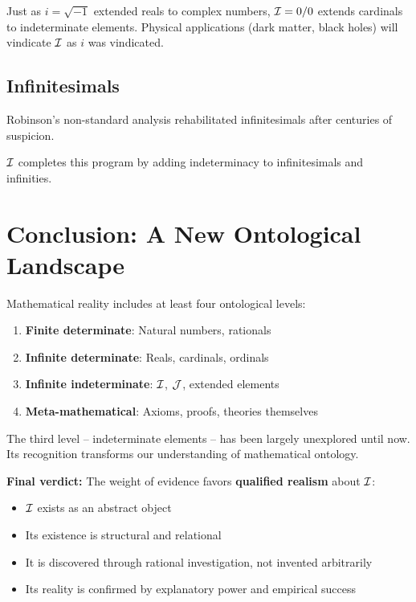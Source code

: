 \begin{proposition}[Parallel to $\I$]
Just as $i = \sqrt{-1}$ extended reals to complex numbers, $\mathcal{I} = 0/0$ extends cardinals to indeterminate elements. Physical applications (dark matter, black holes) will vindicate $\I$ as $i$ was vindicated.
\end{proposition}

\subsection{Infinitesimals}

Robinson's non-standard analysis rehabilitated infinitesimals after centuries of suspicion.

$\I$ completes this program by adding indeterminacy to infinitesimals and infinities.

\section{Conclusion: A New Ontological Landscape}

\begin{theorem}
Mathematical reality includes at least four ontological levels:
\begin{enumerate}
    \item \textbf{Finite determinate}: Natural numbers, rationals
    \item \textbf{Infinite determinate}: Reals, cardinals, ordinals
    \item \textbf{Infinite indeterminate}: $\I$, $\mathcal{J}$, extended elements
    \item \textbf{Meta-mathematical}: Axioms, proofs, theories themselves
\end{enumerate}
\end{theorem}

The third level -- indeterminate elements -- has been largely unexplored until now. Its recognition transforms our understanding of mathematical ontology.

\textbf{Final verdict:} The weight of evidence favors \textbf{qualified realism} about $\I$:
\begin{itemize}
    \item $\I$ exists as an abstract object
    \item Its existence is structural and relational
    \item It is discovered through rational investigation, not invented arbitrarily
    \item Its reality is confirmed by explanatory power and empirical success
\end{itemize}

